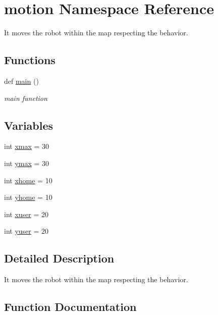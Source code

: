 \hypertarget{namespacemotion}{}\section{motion Namespace Reference}
\label{namespacemotion}


It moves the robot within the map respecting the behavior.  


\subsection*{Functions}
\begin{DoxyCompactItemize}
\item 
def \hyperlink{namespacemotion_ad6289fca8572f5af95fd28f4c2dbc68d}{main} ()
\begin{DoxyCompactList}\small\item\em main function \end{DoxyCompactList}\end{DoxyCompactItemize}
\subsection*{Variables}
\begin{DoxyCompactItemize}
\item 
int \hyperlink{namespacemotion_ad15e7b7b1c76162401252ee7533515a4}{xmax} = 30
\item 
int \hyperlink{namespacemotion_a93496959e7cd7b64c958600e13052b02}{ymax} = 30
\item 
int \hyperlink{namespacemotion_a8e0cdf80e6970df1d82ccd96e3f68a1a}{xhome} = 10
\item 
int \hyperlink{namespacemotion_ad24c81915bdf6ae465698c9f63e0c419}{yhome} = 10
\item 
int \hyperlink{namespacemotion_ac1191b288873954280855513ee9ed701}{xuser} = 20
\item 
int \hyperlink{namespacemotion_ae750031c9c1b1e4435481bee11eaf94e}{yuser} = 20
\end{DoxyCompactItemize}


\subsection{Detailed Description}
It moves the robot within the map respecting the behavior. 

\subsection{Function Documentation}
